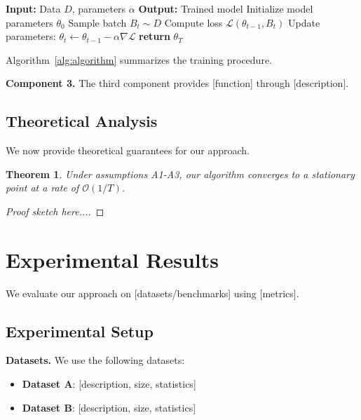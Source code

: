 \documentclass[conference]{IEEEtran}
\theoremstyle{plain}
\newtheorem{theorem}{Theorem}
\theoremstyle{definition}
\begin{document}
\begin{algorithm}[htbp]
\caption{Algorithm Name}
\label{alg:algorithm}
\begin{algorithmic}
\State \textbf{Input:} Data $D$, parameters $\alpha$
\State \textbf{Output:} Trained model
\State Initialize model parameters $\theta_0$
  \State Sample batch $B_t \sim D$
  \State Compute loss $\mathcal{L}(\theta_{t-1}, B_t)$
  \State Update parameters: $\theta_t \leftarrow \theta_{t-1} - \alpha \nabla \mathcal{L}$
\EndFor
\State \textbf{return} $\theta_T$
\end{algorithmic}
\end{algorithm}

Algorithm~\ref{alg:algorithm} summarizes the training procedure.

\textbf{Component 3.} The third component provides [function] through 
[description].

\subsection{Theoretical Analysis}

We now provide theoretical guarantees for our approach.

\begin{theorem}
Under assumptions A1-A3, our algorithm converges to a stationary point 
at a rate of $\mathcal{O}(1/T)$.
\end{theorem}

\begin{proof}
[Proof sketch here...]
\end{proof}

\section{Experimental Results}
\label{sec:experiments}

We evaluate our approach on [datasets/benchmarks] using [metrics].

\subsection{Experimental Setup}

\textbf{Datasets.} We use the following datasets:
\begin{itemize}
  \item \textbf{Dataset A}: [description, size, statistics]
  \item \textbf{Dataset B}: [description, size, statistics]
\end{itemize}
\end{document}
